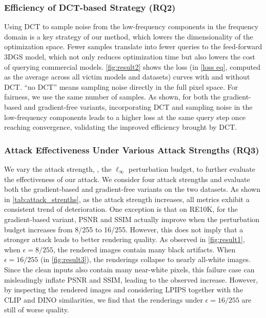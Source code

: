 \documentclass[runningheads]{llncs}
\begin{document}
\subsubsection{Efficiency of DCT-based Strategy (RQ2)}

Using DCT to sample noise from the low-frequency components in the frequency domain is a key strategy of our method, which lowers the dimensionality of the optimization space. Fewer samples translate into fewer queries to the feed-forward 3DGS model, which not only reduces optimization time but also lowers the cost of querying commercial models. \cref{fig:result2} shows the loss (in  \cref{loss eq}, computed as the average across all victim models and datasets) curves with and without DCT. “no DCT” means sampling noise directly in the full pixel space. For fairness, we use the same number of samples. As shown, for both the gradient-based and gradient-free variants, incorporating DCT and sampling noise in the low-frequency components leads to a higher loss at the same query step once reaching convergence, validating the improved efficiency brought by DCT. %



\subsubsection{Attack Effectiveness Under Various Attack Strengths (RQ3)}

We vary the attack strength, \ie, the $\ell_\infty$ perturbation budget, to further evaluate the effectiveness of our attack. We consider four attack strengths and evaluate both the gradient-based and gradient-free variants on the two datasets. As shown in \cref{tab:attack_strenths}, as the attack strength increases, all metrics exhibit a consistent trend of deterioration. One exception is that on RE10K, for the gradient-based variant, PSNR and SSIM actually improve when the perturbation budget increases from 8/255 to 16/255. However, this does not imply that a stronger attack leads to better rendering quality. As observed in \cref{fig:result1}, when $\epsilon = 8/255$, the rendered images contain many black artifacts. When $\epsilon = 16/255$ (in \cref{fig:result3}), the renderings collapse to nearly all-white images. Since the clean inputs also contain many near-white pixels, this failure case can misleadingly inflate PSNR and SSIM, leading to the observed increase. However, by inspecting the rendered images and considering LPIPS together with the CLIP and DINO similarities, we find that the renderings under $\epsilon = 16/255$ are still of worse quality.
\end{document}

